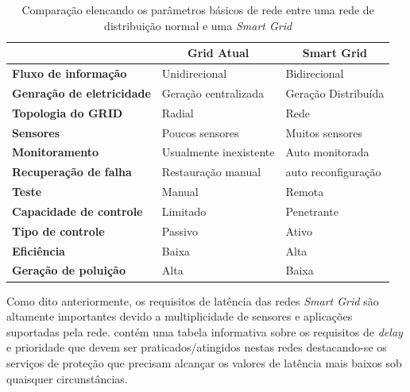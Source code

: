 \begin{table}[]
\begin{tabular}{l|l|l|}
\cline{2-3}
 & \multicolumn{1}{c|}{\textbf{Grid Atual}} & \multicolumn{1}{c|}{\textbf{Smart Grid}} \\ \hline
\multicolumn{1}{|l|}{\textbf{Fluxo de informação}} & Unidirecional & Bidirecional \\ \hline
\multicolumn{1}{|l|}{\textbf{Genração de eletricidade}} & Geração centralizada & Geração Distribuída \\ \hline
\multicolumn{1}{|l|}{\textbf{Topologia do GRID}} & Radial & Rede \\ \hline
\multicolumn{1}{|l|}{\textbf{Sensores}} & Poucos sensores & Muitos sensores \\ \hline
\multicolumn{1}{|l|}{\textbf{Monitoramento}} & Usualmente inexistente & Auto monitorada \\ \hline
\multicolumn{1}{|l|}{\textbf{Recuperação de falha}} & Restauração manual & auto reconfiguração \\ \hline
\multicolumn{1}{|l|}{\textbf{Teste}} & Manual & Remota \\ \hline
\multicolumn{1}{|l|}{\textbf{Capacidade de controle}} & Limitado & Penetrante \\ \hline
\multicolumn{1}{|l|}{\textbf{Tipo de controle}} & Passivo & Ativo \\ \hline
\multicolumn{1}{|l|}{\textbf{Eficiência}} & Baixa & Alta \\ \hline
\multicolumn{1}{|l|}{\textbf{Geração de poluição}} & Alta & Baixa \\ \hline
\end{tabular}
\caption[Comparação entre GRIDS normal e \emph{Smart}]{Comparação elencando os parâmetros básicos de rede entre uma rede de distribuição normal e uma \emph{Smart Grid}}
\label{tab_comparacao_grids}
\end{table}

Como dito anteriormente, os requisitos de latência das redes \emph{Smart Grid} são altamente importantes devido a multiplicidade de sensores e aplicações suportadas pela rede. \cite{Art-Deshpande2011} contém uma tabela informativa sobre os requisitos de \emph{delay} e prioridade que devem ser praticados/atingidos nestas redes destacando-se os serviços de proteção que precisam alcançar os valores de latência mais baixos sob quaisquer circunstâncias. 